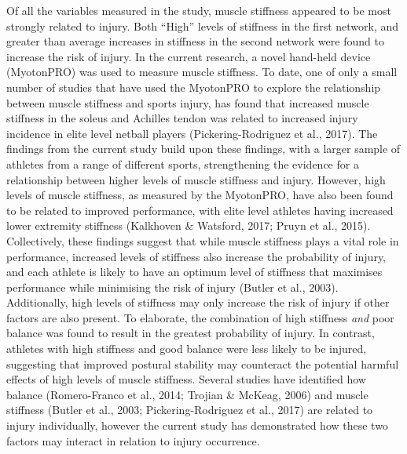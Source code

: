 \documentclass[man,floatsintext]{apa6}
\begin{document}
Of all the variables measured in the study, muscle stiffness appeared to be most strongly related to injury.
Both \enquote{High} levels of stiffness in the first network, and greater than average increases in stiffness in the second network were found to increase the risk of injury.
In the current research, a novel hand-held device (MyotonPRO) was used to measure muscle stiffness.
To date, one of only a small number of studies that have used the MyotonPRO to explore the relationship between muscle stiffness and sports injury, has found that increased muscle stiffness in the soleus and Achilles tendon was related to increased injury incidence in elite level netball players (Pickering-Rodriguez et al., 2017).
The findings from the current study build upon these findings, with a larger sample of athletes from a range of different sports, strengthening the evidence for a relationship between higher levels of muscle stiffness and injury.
However, high levels of muscle stiffness, as measured by the MyotonPRO, have also been found to be related to improved performance, with elite level athletes having increased lower extremity stiffness (Kalkhoven \& Watsford, 2017; Pruyn et al., 2015).
Collectively, these findings suggest that while muscle stiffness plays a vital role in performance, increased levels of stiffness also increase the probability of injury, and each athlete is likely to have an optimum level of stiffness that maximises performance while minimising the risk of injury (Butler et al., 2003).
Additionally, high levels of stiffness may only increase the risk of injury if other factors are also present.
To elaborate, the combination of high stiffness \emph{and} poor balance was found to result in the greatest probability of injury.
In contrast, athletes with high stiffness and good balance were less likely to be injured, suggesting that improved postural stability may counteract the potential harmful effects of high levels of muscle stiffness.
Several studies have identified how balance (Romero-Franco et al., 2014; Trojian \& McKeag, 2006) and muscle stiffness (Butler et al., 2003; Pickering-Rodriguez et al., 2017) are related to injury individually, however the current study has demonstrated how these two factors may interact in relation to injury occurrence.
\end{document}
